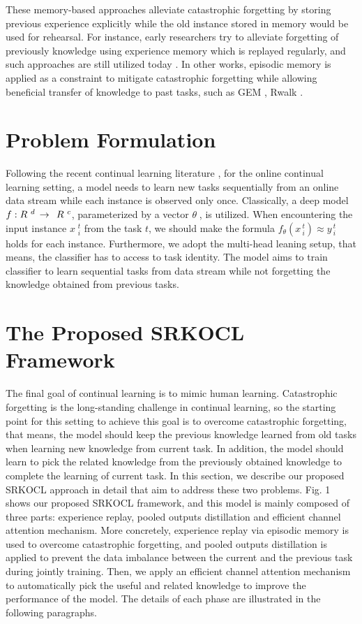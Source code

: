 \documentclass[review]{elsarticle}
\begin{document}
These memory-based approaches alleviate catastrophic forgetting by storing previous experience explicitly while the old instance stored in memory would be used for rehearsal. For instance, early researchers \cite{13robins1993catastrophic} try to alleviate forgetting of previously knowledge using experience memory which is replayed regularly, and such approaches are still utilized today \cite{11rebuffi2017icarl}. In other works, episodic memory is applied as a constraint to mitigate catastrophic forgetting while allowing beneficial transfer of knowledge to past tasks, such as GEM \cite{14lopez2017gradient}, Rwalk \cite{15chaudhry2018riemannian}. 

\section{Problem Formulation}

Following the recent continual learning literature \cite{14lopez2017gradient,3pham2019bilevel}, for the online continual learning setting, a model needs to learn new tasks sequentially from an online data stream while each instance is observed only once. Classically, a deep model $f:R{{\kern 1pt} ^{\;d}}\, \to \;\,R{{\kern 1pt} ^{\;c}}$, parameterized by a vector $\theta \;$,  is utilized. When encountering the input instance $x\;_i^t$  from the task $t$,  we should make the formula ${f_\theta }\left( {x\,_i^t} \right) \approx y\,_i^t$ holds for each instance. Furthermore, we adopt the multi-head leaning setup, that means, the classifier has to access to task identity. The model aims to train classifier to learn sequential tasks from data stream while not forgetting the knowledge obtained from previous tasks.

\section{The Proposed SRKOCL Framework}

The final goal of continual learning is to mimic human learning. Catastrophic forgetting is the long-standing challenge in continual learning, so the starting point for this setting to achieve this goal is to overcome catastrophic forgetting, that means, the model should keep the previous knowledge learned from old tasks when learning new knowledge from current task. In addition, the model should learn to pick the related knowledge from the previously obtained knowledge to complete the learning of current task. In this section, we describe our proposed SRKOCL approach in detail that aim to address these two problems. Fig. 1 shows our proposed SRKOCL framework, and this model is mainly composed of three parts: experience replay, pooled outputs distillation and efficient channel attention mechanism. More concretely, experience replay via episodic memory is used to overcome catastrophic forgetting, and pooled outputs distillation is applied to prevent the data imbalance between the current and the previous task during jointly training. Then, we apply an efficient channel attention mechanism to automatically pick the useful and related knowledge to improve the performance of the model. The details of each phase are illustrated in the following paragraphs.
\end{document}
